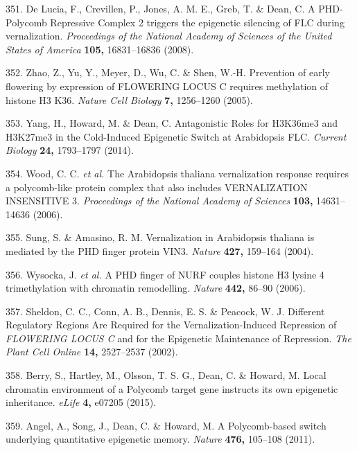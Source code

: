 \documentclass[12pt,]{book}
\begin{document}
\hypertarget{ref-de_lucia_phd_polycomb_2008}{}
351. De Lucia, F., Crevillen, P., Jones, A. M. E., Greb, T. \& Dean, C.
A PHD-Polycomb Repressive Complex 2 triggers the epigenetic silencing of
FLC during vernalization. \emph{Proceedings of the National Academy of
Sciences of the United States of America} \textbf{105,} 16831--16836
(2008).

\hypertarget{ref-zhao_prevention_2005}{}
352. Zhao, Z., Yu, Y., Meyer, D., Wu, C. \& Shen, W.-H. Prevention of
early flowering by expression of FLOWERING LOCUS C requires methylation
of histone H3 K36. \emph{Nature Cell Biology} \textbf{7,} 1256--1260
(2005).

\hypertarget{ref-yang_antagonistic_2014}{}
353. Yang, H., Howard, M. \& Dean, C. Antagonistic Roles for H3K36me3
and H3K27me3 in the Cold-Induced Epigenetic Switch at Arabidopsis FLC.
\emph{Current Biology} \textbf{24,} 1793--1797 (2014).

\hypertarget{ref-wood_arabidopsis_2006}{}
354. Wood, C. C. \emph{et al.} The Arabidopsis thaliana vernalization
response requires a polycomb-like protein complex that also includes
VERNALIZATION INSENSITIVE 3. \emph{Proceedings of the National Academy
of Sciences} \textbf{103,} 14631--14636 (2006).

\hypertarget{ref-sung_vernalization_2004}{}
355. Sung, S. \& Amasino, R. M. Vernalization in Arabidopsis thaliana is
mediated by the PHD finger protein VIN3. \emph{Nature} \textbf{427,}
159--164 (2004).

\hypertarget{ref-wysocka_phd_2006}{}
356. Wysocka, J. \emph{et al.} A PHD finger of NURF couples histone H3
lysine 4 trimethylation with chromatin remodelling. \emph{Nature}
\textbf{442,} 86--90 (2006).

\hypertarget{ref-sheldon_different_2002}{}
357. Sheldon, C. C., Conn, A. B., Dennis, E. S. \& Peacock, W. J.
Different Regulatory Regions Are Required for the Vernalization-Induced
Repression of \emph{FLOWERING LOCUS C} and for the Epigenetic
Maintenance of Repression. \emph{The Plant Cell Online} \textbf{14,}
2527--2537 (2002).

\hypertarget{ref-berry_local_2015}{}
358. Berry, S., Hartley, M., Olsson, T. S. G., Dean, C. \& Howard, M.
Local chromatin environment of a Polycomb target gene instructs its own
epigenetic inheritance. \emph{eLife} \textbf{4,} e07205 (2015).

\hypertarget{ref-angel_polycomb_based_2011}{}
359. Angel, A., Song, J., Dean, C. \& Howard, M. A Polycomb-based switch
underlying quantitative epigenetic memory. \emph{Nature} \textbf{476,}
105--108 (2011).
\end{document}
